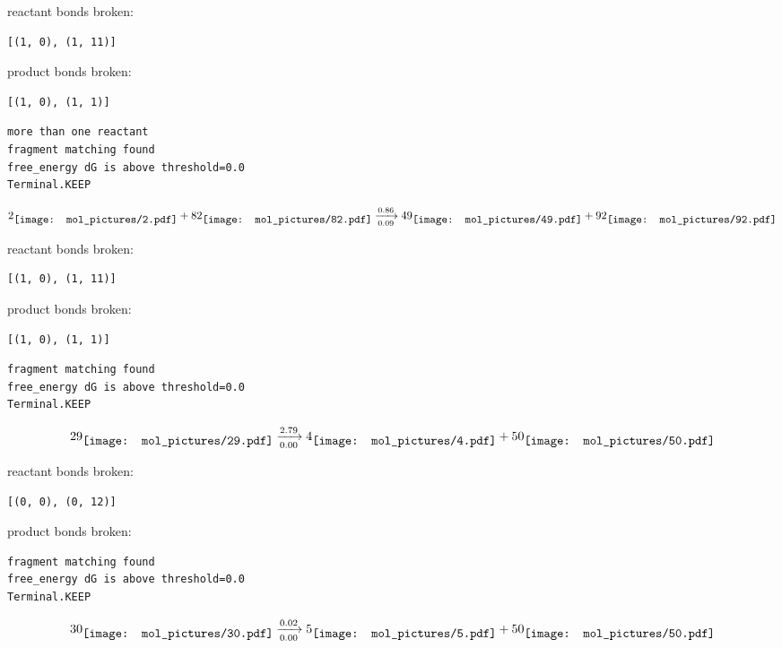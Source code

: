 \documentclass{article}
\begin{document}
reactant bonds broken:\begin{verbatim}
[(1, 0), (1, 11)]
\end{verbatim}
product bonds broken:\begin{verbatim}
[(1, 0), (1, 1)]
\end{verbatim}




\vspace{1cm}
\begin{verbatim}
more than one reactant
fragment matching found
free_energy dG is above threshold=0.0
Terminal.KEEP
\end{verbatim}
$$
2
\raisebox{-.5\height}{\texttt{[image: mol\_pictures/2.pdf]}}
+
82
\raisebox{-.5\height}{\texttt{[image: mol\_pictures/82.pdf]}}
\xrightarrow[0.09]{0.86}
49
\raisebox{-.5\height}{\texttt{[image: mol\_pictures/49.pdf]}}
+
92
\raisebox{-.5\height}{\texttt{[image: mol\_pictures/92.pdf]}}
$$


reactant bonds broken:\begin{verbatim}
[(1, 0), (1, 11)]
\end{verbatim}
product bonds broken:\begin{verbatim}
[(1, 0), (1, 1)]
\end{verbatim}




\vspace{1cm}
\begin{verbatim}
fragment matching found
free_energy dG is above threshold=0.0
Terminal.KEEP
\end{verbatim}
$$
29
\raisebox{-.5\height}{\texttt{[image: mol\_pictures/29.pdf]}}
\xrightarrow[0.00]{2.79}
4
\raisebox{-.5\height}{\texttt{[image: mol\_pictures/4.pdf]}}
+
50
\raisebox{-.5\height}{\texttt{[image: mol\_pictures/50.pdf]}}
$$


reactant bonds broken:\begin{verbatim}
[(0, 0), (0, 12)]
\end{verbatim}
product bonds broken:



\vspace{1cm}
\begin{verbatim}
fragment matching found
free_energy dG is above threshold=0.0
Terminal.KEEP
\end{verbatim}
$$
30
\raisebox{-.5\height}{\texttt{[image: mol\_pictures/30.pdf]}}
\xrightarrow[0.00]{0.02}
5
\raisebox{-.5\height}{\texttt{[image: mol\_pictures/5.pdf]}}
+
50
\raisebox{-.5\height}{\texttt{[image: mol\_pictures/50.pdf]}}
$$
\end{document}
